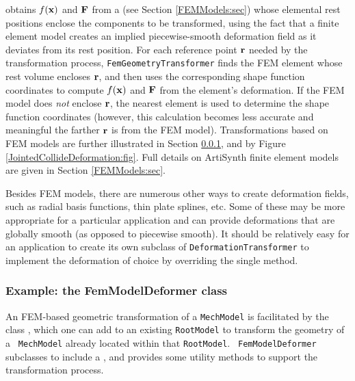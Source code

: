  obtains
$f({\bf x})$ and ${\bf F}$ from a
 (see Section
\ref{FEMModels:sec}) whose elemental rest positions enclose the
components to be transformed, using the fact that a finite element
model creates an implied piecewise-smooth deformation field as it
deviates from its rest position. For each reference point ${\bf r}$ needed
by the transformation process, {\tt FemGeometryTransformer} finds the
FEM element whose rest volume encloses ${\bf r}$, and then uses the
corresponding shape function coordinates to compute $f({\bf x})$ and ${\bf F}$
from the element's deformation. If the FEM model does {\it not}
enclose ${\bf r}$, the nearest element is used to determine the shape
function coordinates (however, this calculation becomes less accurate and
meaningful the farther ${\bf r}$ is from the FEM model). Transformations based
on FEM models are further illustrated in Section
\ref{FemModelDeformer:sec}, and by Figure
\ref{JointedCollideDeformation:fig}. Full details on ArtiSynth finite
element models are given in Section \ref{FEMModels:sec}.

Besides FEM models, there are numerous other ways to create
deformation fields, such as radial basis functions, thin plate
splines, etc. Some of these may be more appropriate for a particular
application and can provide deformations that are globally smooth (as
opposed to piecewise smooth).  It should be relatively easy for an
application to create its own subclass of {\tt DeformationTransformer}
to implement the deformation of choice by overriding the single
method.

\subsubsection{Example: the FemModelDeformer class}
\label{FemModelDeformer:sec}

An FEM-based geometric transformation of a {\tt MechModel} is
facilitated by the class
, which one can
add to an existing {\tt RootModel} to transform the geometry of a {\tt
MechModel} already located within that {\tt RootModel}.  {\tt
FemModelDeformer} subclasses
 to include a
, and
provides some utility methods to support the transformation process.

